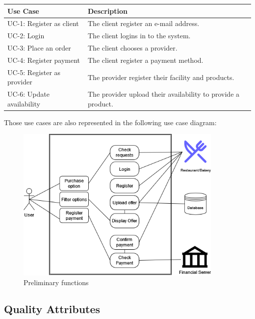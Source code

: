 \begin{table}[H]
    \begin{tabularx}{\textwidth}{lX}
    \toprule
    Use Case & Description  \\
    \midrule
    UC-1: Register as \gls{client} & The \gls{client} register an e-mail address.\\
    UC-2: Login & The \gls{client} logins in to the system. \\
    UC-3: Place an order & The \gls{client} chooses a \gls{provider}. \\
    UC-4: Register payment & The \gls{client} register a payment method. \\
    UC-5: Register as \gls{provider} & The \gls{provider} register their facility and products. \\
    UC-6: Update availability & The \gls{provider} upload their availability to provide a product. \\
    \bottomrule
    \end{tabularx}
\end{table}

Those use cases are also represented in the following use case diagram:

\begin{figure}[H]
    \centering
    \includegraphics[width=0.9\textwidth]{assets/preliminary_use_case.png}
    \caption{Preliminary functions}
    \label{fig:preliminary_use_case}
\end{figure}


\subsection{Quality Attributes}

